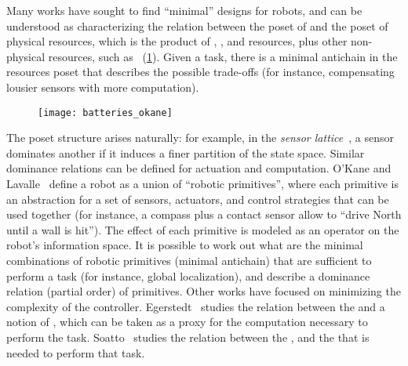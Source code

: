Many works have sought to find ``minimal'' designs for robots, and
can be understood as characterizing the relation between the poset
of  and the poset of physical resources, which is the product
of , , and  resources,
plus other non-physical resources, such as ~(\cref{fig:robot-generic}).
Given a task, there is a minimal antichain in the resources poset
that describes the possible trade-offs (for instance, compensating lousier
sensors with more computation).

\begin{figure}
  \centering
  \texttt{[image: batteries\_okane]}
  \caption{}
  \label{fig:robot-generic}
\end{figure}





The poset structure arises naturally: for example, in the \emph{sensor
lattice}~\cite{lavalle12sensing}, a sensor dominates another
if it induces a finer partition of the state space. Similar dominance
relations can be defined for actuation and computation. O'Kane and
Lavalle~\cite{okane08comparing} define a robot as a union of ``robotic
primitives'', where each primitive is an abstraction for a set of
sensors, actuators, and control strategies that can be used together
(for instance, a compass plus a contact sensor allow to ``drive North until
a wall is hit''). The effect of each primitive is modeled as an operator
on the robot's information space. It is possible to work out what
are the minimal combinations of robotic primitives (minimal antichain)
that are sufficient to perform a task (for instance, global localization),
and describe a dominance relation (partial order) of primitives. Other
works have focused on minimizing the complexity of the controller.
Egerstedt~\cite{egerstedt03motion} studies the relation between
the  and a notion of , which can be taken as
a proxy for the computation necessary to perform the task. Soatto~\cite{soatto11steps}
studies the relation between the ,
and the  that is needed to perform that
task.


\begin{example}
\end{example}